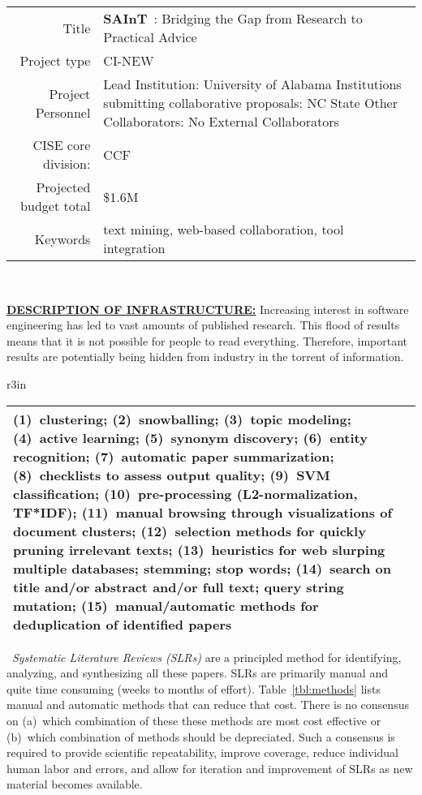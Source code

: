  
 \newcommand{\IT}{\textsf{\textbf{{SAInT}}}}
 
 \newcommand{\head}[1]{\noindent\underline{{\bf #1:}}}
 
 \noindent\begin{tabular}{|r@{~: ~}p{12.3cm}|}\hline
 Title &
\IT~: Bridging the Gap from Research to Practical Advice
\\
Project type &  CI-NEW\\
Project Personnel &
 Lead Institution: University of Alabama \newline
 Institutions submitting collaborative proposals:  NC State\newline
 Other Collaborators:  No External Collaborators\\
CISE core division: & CCF\\
Projected budget total & \$1.6M \\
Keywords&  text mining, web-based collaboration, tool integration\\\hline
\end{tabular}
~\vspace{2mm}

\head{DESCRIPTION OF INFRASTRUCTURE}
Increasing interest in software engineering has led to vast amounts of published research.
This flood of results means that it is not possible for people to read everything. 
Therefore, important results are potentially being hidden from industry in the torrent of information.

\begin{wraptable}{r}{3in}
{\footnotesize
\begin{tabular}{|p{2.9in}|}\hline
(1)~clustering;
(2)~snowballing;
(3)~topic modeling;
(4)~active learning;
(5)~synonym discovery;
(6)~entity recognition; 
(7)~automatic paper summarization; 
(8)~checklists to assess output quality; 
(9)~SVM classification;
(10)~pre-processing (L2-normalization, TF*IDF);
(11)~manual browsing through visualizations of document clusters;
(12)~selection methods for quickly pruning irrelevant texts;
(13)~heuristics for web slurping multiple databases; stemming; stop words;     
(14)~search on title and/or abstract and/or full text; query string mutation; 
(15)~manual/automatic methods for deduplication of identified papers\\
\hline
\end{tabular}}
\caption{An incomplete list of methods for  studying  very large collections of research papers
}\label{tbl:methods}
\end{wraptable}
~{\em Systematic Literature Reviews (SLRs)} are a principled method for identifying, analyzing, and synthesizing all these papers.
SLRs are primarily manual and quite time consuming (weeks to months of effort). 
Table~\ref{tbl:methods} lists manual and automatic methods that can reduce that cost. 
There is no consensus on (a)~which combination of these these methods are most cost effective or (b)~which combination of methods should be depreciated.  
Such a consensus is required to provide scientific repeatability, improve coverage, reduce individual human labor and errors, and allow for iteration and improvement of SLRs as new material becomes available. 

